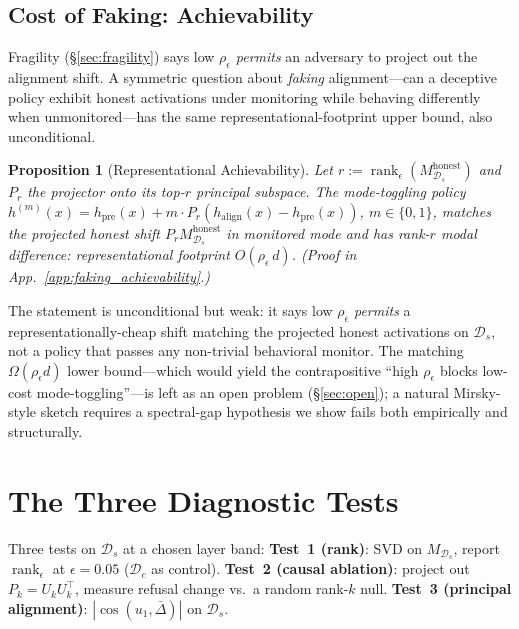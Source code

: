 \documentclass[10pt]{article}
\newtheorem{proposition}[theorem]{Proposition}
\theoremstyle{definition}
\theoremstyle{remark}
\begin{document}
\subsection{Cost of Faking: Achievability}
\label{sec:faking_achievability_body}

Fragility (\S\ref{sec:fragility}) says low
$\rho_{\epsilon}$ \emph{permits} an adversary to
project out the alignment shift.  A symmetric question
about \emph{faking} alignment---can a deceptive policy
exhibit honest activations under monitoring while
behaving differently when unmonitored---has the same
representational-footprint upper bound, also
unconditional.

\begin{proposition}[Representational Achievability]
\label{prop:faking}
Let $r := \operatorname{rank}_{\epsilon}(M^{\mathrm{honest}}_{\mathcal{D}_s})$
and $P_r$ the projector onto its top-$r$ principal
subspace.  The mode-toggling policy
$h^{(m)}(x) = h_{\mathrm{pre}}(x) + m \cdot
P_r(h_{\mathrm{align}}(x) - h_{\mathrm{pre}}(x))$,
$m\in\{0,1\}$, matches the projected honest shift
$P_r M^{\mathrm{honest}}_{\mathcal{D}_s}$ in monitored
mode and has rank-$r$ modal difference: representational
footprint $O(\rho_{\epsilon}\,d)$.  (Proof in
App.~\ref{app:faking_achievability}.)
\end{proposition}

The statement is unconditional but weak: it says low
$\rho_{\epsilon}$ \emph{permits} a representationally-cheap
shift matching the projected honest activations on
$\mathcal{D}_s$, not a policy that passes any non-trivial
behavioral monitor.  The matching $\Omega(\rho_{\epsilon}d)$
lower bound---which would yield the contrapositive
``high $\rho_{\epsilon}$ blocks low-cost
mode-toggling''---is left as an open problem
(\S\ref{sec:open}); a natural Mirsky-style sketch
requires a spectral-gap hypothesis we show fails both
empirically and structurally.


\section{The Three Diagnostic Tests}
\label{sec:verification}

Three tests on $\mathcal{D}_s$ at a chosen layer band:
\textbf{Test~1 (rank)}: SVD on $M_{\mathcal{D}_s}$,
report $\operatorname{rank}_{\epsilon}$ at
$\epsilon=0.05$ ($\mathcal{D}_c$ as control).
\textbf{Test~2 (causal ablation)}: project out
$P_k = U_k U_k^\top$, measure refusal change vs.\ a
random rank-$k$ null.
\textbf{Test~3 (principal alignment)}:
$|\cos(u_1, \bar{\Delta})|$ on $\mathcal{D}_s$.
\end{document}

